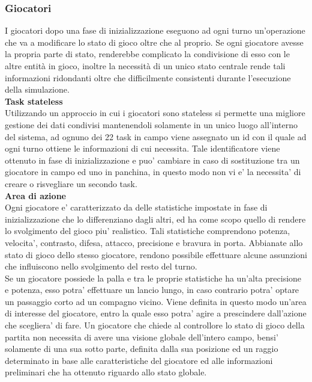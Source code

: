 \subsubsection{Giocatori}
\label{sec:analisi_concorrenza_giocatori}

I giocatori dopo una fase di inizializzazione eseguono ad ogni turno un'operazione che va a modificare lo stato di gioco oltre che al proprio. Se ogni giocatore avesse la propria parte di stato, renderebbe complicato la condivisione di esso con le altre entità in gioco, inoltre la necessità di un unico stato centrale rende tali informazioni ridondanti oltre che difficilmente consistenti durante l'esecuzione della simulazione.\\

\textbf{Task stateless}\\

Utilizzando un approccio in cui i giocatori sono stateless si permette una migliore gestione dei dati condivisi mantenendoli solamente in un unico luogo all'interno del sistema, ad ognuno dei 22 task in campo viene assegnato un id con il quale ad ogni turno ottiene le informazioni di cui necessita. Tale identificatore viene ottenuto in fase di inizializzazione e puo' cambiare in caso di sostituzione tra un giocatore in campo ed uno in panchina, in questo modo non vi e' la necessita' di creare o risvegliare un secondo task.\\

\textbf{Area di azione}\\

Ogni giocatore e' caratterizzato da delle statistiche impostate in fase di inizializzazione che lo differenziano dagli altri, ed ha come scopo quello di rendere lo svolgimento del gioco piu' realistico. Tali statistiche comprendono potenza, velocita', contrasto, difesa, attacco, precisione e bravura in porta. Abbianate allo stato di gioco dello stesso giocatore, rendono possibile effettuare alcune assunzioni che influiscono nello svolgimento del resto del turno. \\

Se un giocatore possiede la palla e tra le proprie statistiche ha un'alta precisione e potenza, esso potra' effettuare un lancio lungo, in caso contrario potra' optare un passaggio corto ad un compagno vicino. Viene definita in questo modo un'area di interesse del giocatore, entro la quale esso potra' agire a prescindere dall'azione che scegliera' di fare. Un giocatore che chiede al controllore lo stato di gioco della partita non necessita di avere una visione globale dell'intero campo, bensi' solamente di una sua sotto parte, definita dalla sua posizione ed un raggio determinato in base alle caratteristiche del giocatore ed alle informazioni preliminari che ha ottenuto riguardo allo stato globale.\\

